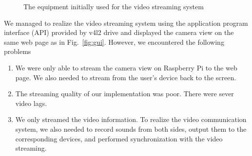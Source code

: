 \documentclass[12pt]{article}
\begin{document}
\begin{figure}[!htbp]
{\begin{minipage}[b]{0.3\linewidth}
		\end{minipage}
		\label{fig::non-disjunctive1}
	}


	\caption{The equipment initially used for the video streaming system}
	\label{fig:screen}
\end{figure}

We managed to realize the video streaming system using the application program interface (API) provided by v4l2 drive and displayed the camera view on the same web page as in Fig.~\ref{fig:gui}. However, we encountered the following problems
\begin{enumerate}
	\item We were only able to stream the camera view on Raspberry Pi to the web page. We also needed to stream from the user's device back to the screen.
	\item The streaming quality of our implementation was poor. There were sever video lags.
	\item We only streamed the video information. To realize the video communication system, we also needed to record sounds from both sides, output them to the corresponding devices, and performed synchronization with the video streaming.
\end{enumerate}
\end{document}
